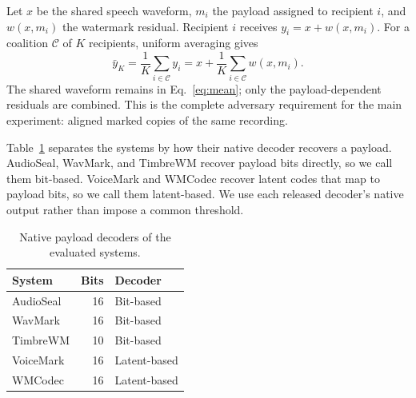 \documentclass{article}
\begin{document}
Let $x$ be the shared speech waveform, $m_i$ the payload assigned to recipient $i$, and $w(x,m_i)$ the watermark residual. Recipient $i$ receives $y_i=x+w(x,m_i)$. For a coalition $\mathcal C$ of $K$ recipients, uniform averaging gives
\begin{equation}
  \bar y_K=\frac{1}{K}\sum_{i\in\mathcal C}y_i
  =x+\frac{1}{K}\sum_{i\in\mathcal C}w(x,m_i).
  \label{eq:mean}
\end{equation}
The shared waveform remains in Eq.~\eqref{eq:mean}; only the payload-dependent residuals are combined. This is the complete adversary requirement for the main experiment: aligned marked copies of the same recording.

Table~\ref{tab:systems} separates the systems by how their native decoder recovers a payload. AudioSeal, WavMark, and TimbreWM recover payload bits directly, so we call them bit-based. VoiceMark and WMCodec recover latent codes that map to payload bits, so we call them latent-based. We use each released decoder's native output rather than impose a common threshold.

\begin{table}[H]
\centering
\caption{Native payload decoders of the evaluated systems.}
\label{tab:systems}
\setlength{\tabcolsep}{4.2pt}
\begin{tabular}{lrl}
\toprule
System & Bits & Decoder \\
\midrule
AudioSeal \cite{sanroman2024audioseal} & 16 & Bit-based \\
WavMark \cite{chen2023wavmark} & 16 & Bit-based \\
TimbreWM \cite{liu2024timbre} & 10 & Bit-based \\
VoiceMark \cite{li2025voicemark} & 16 & Latent-based \\
WMCodec \cite{zhou2024wmcodec} & 16 & Latent-based \\
\bottomrule
\end{tabular}
\end{table}

\begin{table}[!b]
\centering
\caption{TF and speech quality after uniform averaging (300 valid-input coalitions per cell).}
\label{tab:risk}
\setlength{\tabcolsep}{3.7pt}
\renewcommand{\arraystretch}{0.94}

\end{table}
\end{document}
